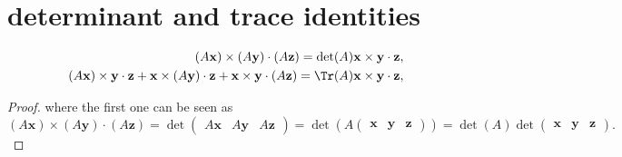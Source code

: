 \section{determinant and trace identities}
\[
    \begin{aligned}
        (A \mathbf{x}) \times (A \mathbf{y}) \cdot (A \mathbf{z}) = \det(A) \mathbf{x} \times \mathbf{y} \cdot \mathbf{z}, \\
        (A \mathbf{x}) \times \mathbf{y} \cdot \mathbf{z} + \mathbf{x} \times (A \mathbf{y}) \cdot \mathbf{z} + \mathbf{x} \times \mathbf{y} \cdot (A \mathbf{z}) = \Tr(A) \mathbf{x} \times \mathbf{y} \cdot \mathbf{z},
    \end{aligned}
\]
\begin{proof}
    where the first one can be seen as
    \[
        (A \mathbf{x}) \times (A \mathbf{y}) \cdot (A \mathbf{z}) = \det\begin{pmatrix}
            A\mathbf{x} & A\mathbf{y} & A\mathbf{z}
        \end{pmatrix} = \det (A \begin{pmatrix}
                \mathbf{x} & \mathbf{y} & \mathbf{z} \end{pmatrix}) = \det(A) \det\begin{pmatrix}
            \mathbf{x} & \mathbf{y} & \mathbf{z}
        \end{pmatrix}.
    \]


\end{proof}

